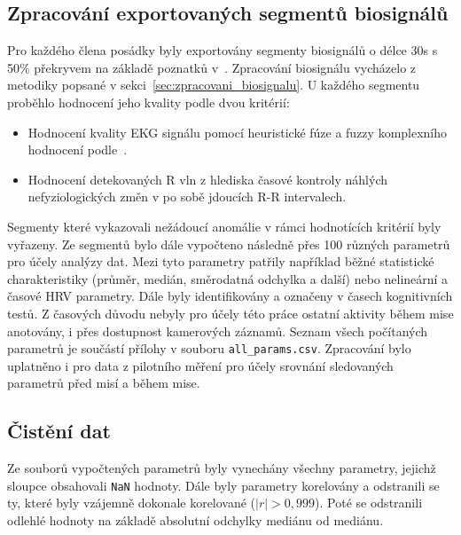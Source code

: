 \subsection{Zpracování exportovaných segmentů biosignálů}
\label{subsec:prezpracovani_segmentu}
Pro každého člena posádky byly exportovány segmenty biosignálů o délce 30s s
50\% překryvem na základě poznatků
v~\cite{Castaldo2019,Kim2021,Pecchia2018,Shaffer2020,Tervonen2021}. Zpracování
biosignálu vycházelo z metodiky popsané v sekci~\ref{sec:zpracovani_biosignalu}.
U každého segmentu proběhlo hodnocení jeho kvality podle dvou kritérií:
\begin{itemize}
      \item Hodnocení kvality \gls{EKG} signálu pomocí heuristické fúze a fuzzy
            komplexního hodnocení podle~\cite{Zhao2018}.
      \item Hodnocení detekovaných R vln z hlediska časové kontroly náhlých
            nefyziologických změn v po sobě jdoucích R-R intervalech.
\end{itemize}
Segmenty které vykazovali nežádoucí anomálie v rámci hodnotících kritérií byly
vyřazeny. Ze segmentů bylo dále vypočteno následně přes 100 různých parametrů
pro účely analýzy dat. Mezi tyto parametry patřily například běžné statistické
charakteristiky (průměr, medián, směrodatná odchylka a další) nebo nelineární a
časové \gls{HRV} parametry. Dále byly identifikovány a označeny v časech
kognitivních testů. Z časových důvodu nebyly pro účely této práce ostatní
aktivity během mise anotovány, i přes dostupnost kamerových záznamů. Seznam
všech počítaných parametrů je součástí přílohy v souboru
\texttt{all\_params.csv}. Zpracování bylo uplatněno i pro data z pilotního
měření pro účely srovnání sledovaných parametrů před misí a během mise.

\subsection{Čistění dat}
\label{subsec:cisteni_dat}
Ze souborů vypočtených parametrů byly vynechány všechny parametry, jejichž
sloupce obsahovali \texttt{NaN} hodnoty. Dále byly parametry korelovány a
odstranili se ty, které byly vzájemně dokonale korelované ($|r| > 0,999$). Poté
se odstranili odlehlé hodnoty na základě absolutní odchylky mediánu od mediánu.

